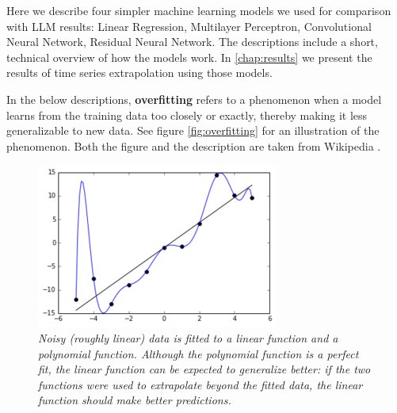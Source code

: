 Here we describe four simpler machine learning models we used for comparison with LLM results: Linear Regression, Multilayer Perceptron, Convolutional Neural Network, Residual Neural Network. The descriptions include a short, technical overview of how the models work. In \autoref{chap:results} we present the results of time series extrapolation using those models.

In the below descriptions, \textbf{overfitting} refers to a phenomenon when a model learns from the training data too closely or exactly, thereby making it less generalizable to new data. See  figure  \autoref{fig:overfitting} for an illustration of the phenomenon. Both the figure and the description are taken from Wikipedia \cite{overfitting}.
\begin{figure}[h!]
	\centering
	\includegraphics[width=0.5\linewidth]{"pictures/overfitted_data.png"}
	\caption{\textit{Noisy (roughly linear) data is fitted to a linear function and a polynomial function. Although the polynomial function is a perfect fit, the linear function can be expected to generalize better: if the two functions were used to extrapolate beyond the fitted data, the linear function should make better predictions.}}
	\label{fig:overfitting}
\end{figure}
